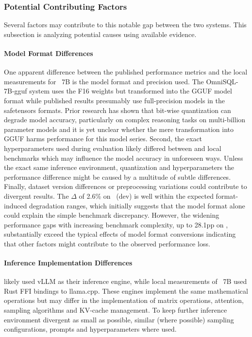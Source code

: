 \subsubsection{Potential Contributing Factors}

Several factors may contribute to this notable gap between the two systems.
This subsection is analyzing potential causes using available evidence.

\paragraph{Model Format Differences}

One apparent difference between the published performance metrics and the local
measurements for \OmniSQL~7B is the model format and precision used. The
OmniSQL-7B-gguf system uses the F16 weights but transformed into the GGUF
model format while published results presumably use full-precision models in
the safetensors formats. Prior research has shown that bit-wise quantization
can degrade model accuracy, particularly on complex reasoning tasks on
multi-billion parameter models \citep{Int8AtScale} and it is yet unclear
whether the mere transformation into GGUF harms performance for this model
series. Second, the exact hyperparameters used during evaluation likely
differed between \cite{OmniSQL} and local benchmarks which may influence the
model accuracy in unforeseen ways. Unless the exact same inference environment,
quantization and hyperparameters the performance difference might be caused by
a multitude of subtle differences. Finally, dataset version differences or
preprocessing variations could contribute to divergent results. The $\Delta$ of
2.6\% on \Spider~(dev) is well within the expected format-induced degradation
ranges, which initially suggests that the model format alone could explain the
simple benchmark discrepancy. However, the widening performance gaps with
increasing benchmark complexity, up to 28.1pp on \Bird, substantially exceed
the typical effects of model format conversions indicating that other factors
might contribute to the observed performance loss.


\paragraph{Inference Implementation Differences}

\citeauthor{OmniSQL} likely used vLLM as their inference engine, while
local measurements of \OmniSQL~7B used Rust FFI bindings to llama.cpp. These
engines implement the same mathematical operations but may differ
in the implementation of matrix operations, attention, sampling algorithms and
KV-cache management. To keep further inference environment divergent as small
as possible, similar (where possible) sampling configurations, prompts and
hyperparameters where used.

